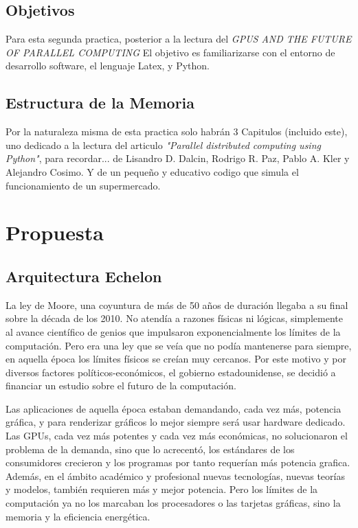 \documentclass[12pt,a4paper,twoside,openright]{report}
\begin{document}
\section{Objetivos}
Para esta segunda practica, posterior a la lectura del \emph{GPUS AND THE FUTURE OF PARALLEL COMPUTING}
El objetivo es familiarizarse con el entorno de desarrollo software, el lenguaje Latex, y Python.

\section{Estructura de la Memoria}
Por la naturaleza misma de esta practica solo habrán 3 Capitulos (incluido este), uno dedicado a la lectura del articulo \emph{"Parallel distributed computing using Python"}, para recordar... de Lisandro D. Dalcin, Rodrigo R. Paz, Pablo A. Kler y Alejandro Cosimo.
Y de un pequeño y educativo codigo que simula el funcionamiento de un supermercado.
\chapter{Propuesta}
\section{Arquitectura Echelon}
\label{cap:resumen}

La ley de Moore, una coyuntura de más de 50 años de duración llegaba a su final sobre la década de los 2010. No atendía a razones físicas ni lógicas, simplemente al avance científico de genios que impulsaron exponencialmente los límites de la computación.
Pero era una ley que se veía que no podía mantenerse para siempre, en aquella época los límites físicos se creían muy cercanos. Por este motivo y por diversos factores políticos-económicos, el gobierno estadounidense, se decidió a financiar un estudio sobre el futuro de la computación.
\smallskip

Las aplicaciones de aquella época estaban demandando, cada vez más, potencia gráfica, y para renderizar gráficos lo mejor siempre será usar hardware dedicado.
Las GPUs, cada vez más potentes y cada vez más económicas, no solucionaron el problema de la demanda, sino que lo acrecentó, los estándares de los consumidores crecieron y los programas por tanto requerían más potencia grafica.
Además, en el ámbito académico y profesional nuevas tecnologías, nuevas teorías y modelos, también requieren más y mejor potencia.
Pero los límites de la computación ya no los marcaban los procesadores o las tarjetas gráficas, sino la memoria y la eficiencia energética.
\smallskip
\end{document}
